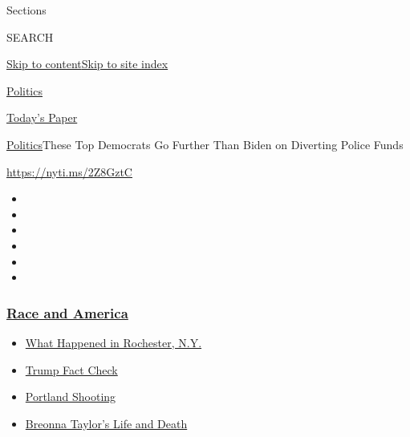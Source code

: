 Sections

SEARCH

\protect\hyperlink{site-content}{Skip to
content}\protect\hyperlink{site-index}{Skip to site index}

\href{https://www.nytimes3xbfgragh.onion/section/politics}{Politics}

\href{https://myaccount.nytimes3xbfgragh.onion/auth/login?response_type=cookie\&client_id=vi}{}

\href{https://www.nytimes3xbfgragh.onion/section/todayspaper}{Today's
Paper}

\href{/section/politics}{Politics}\textbar{}These Top Democrats Go
Further Than Biden on Diverting Police Funds

\url{https://nyti.ms/2Z8GztC}

\begin{itemize}
\item
\item
\item
\item
\item
\item
\end{itemize}

\hypertarget{race-and-america}{%
\subsubsection{\texorpdfstring{\href{https://www.nytimes3xbfgragh.onion/news-event/george-floyd-protests-minneapolis-new-york-los-angeles?name=styln-george-floyd\&region=TOP_BANNER\&block=storyline_menu_recirc\&action=click\&pgtype=Article\&impression_id=ca7cc4f0-f288-11ea-9fb0-77620a216521\&variant=undefined}{Race
and America}}{Race and America}}\label{race-and-america}}

\begin{itemize}
\tightlist
\item
  \href{https://www.nytimes3xbfgragh.onion/2020/09/04/nyregion/rochester-police-daniel-prude.html?name=styln-george-floyd\&region=TOP_BANNER\&block=storyline_menu_recirc\&action=click\&pgtype=Article\&impression_id=ca7cec00-f288-11ea-9fb0-77620a216521\&variant=undefined}{What
  Happened in Rochester, N.Y.}
\item
  \href{https://www.nytimes3xbfgragh.onion/2020/09/01/us/politics/trump-fact-check-protests.html?name=styln-george-floyd\&region=TOP_BANNER\&block=storyline_menu_recirc\&action=click\&pgtype=Article\&impression_id=ca7cec01-f288-11ea-9fb0-77620a216521\&variant=undefined}{Trump
  Fact Check}
\item
  \href{https://www.nytimes3xbfgragh.onion/2020/08/30/us/portland-shooting-explained.html?name=styln-george-floyd\&region=TOP_BANNER\&block=storyline_menu_recirc\&action=click\&pgtype=Article\&impression_id=ca7cec02-f288-11ea-9fb0-77620a216521\&variant=undefined}{Portland
  Shooting}
\item
  \href{https://www.nytimes3xbfgragh.onion/2020/08/30/us/breonna-taylor-police-killing.html?name=styln-george-floyd\&region=TOP_BANNER\&block=storyline_menu_recirc\&action=click\&pgtype=Article\&impression_id=ca7cec03-f288-11ea-9fb0-77620a216521\&variant=undefined}{Breonna
  Taylor's Life and Death}
\end{itemize}

